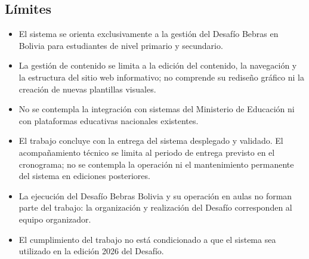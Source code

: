 \subsection{Límites}

\begin{itemize}
    \item El sistema se orienta exclusivamente a la gestión del Desafío Bebras en Bolivia para estudiantes de nivel primario y secundario.
    \item La gestión de contenido se limita a la edición del contenido, la navegación y la estructura del sitio web informativo; no comprende su rediseño gráfico ni la creación de nuevas plantillas visuales.
    \item No se contempla la integración con sistemas del Ministerio de Educación ni con plataformas educativas nacionales existentes.
    \item El trabajo concluye con la entrega del sistema desplegado y validado. El acompañamiento técnico se limita al periodo de entrega previsto en el cronograma; no se contempla la operación ni el mantenimiento permanente del sistema en ediciones posteriores.
    \item La ejecución del Desafío Bebras Bolivia y su operación en aulas no forman parte del trabajo: la organización y realización del Desafío corresponden al equipo organizador.
    \item El cumplimiento del trabajo no está condicionado a que el sistema sea utilizado en la edición 2026 del Desafío.
\end{itemize}
